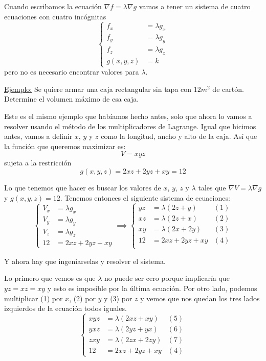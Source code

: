 \documentclass[12pt]{article}
\begin{document}
Cuando escribamos la ecuación $ \nabla f = \lambda \nabla g $ vamos a tener un sistema de cuatro ecuaciones con cuatro incógnitas
\[
  \left\{
  \begin{aligned}
	  f_{x} &= \lambda g_{x} \\
	  f_{y} &= \lambda g_{y} \\
	  f_{z} &= \lambda g_{z} \\
	  g(x,y,z) &= k
  \end{aligned}
  \right.
\]
pero no es necesario encontrar valores para $ \lambda $.


\underline{Ejemplo:} Se quiere armar una caja rectangular sin tapa con $ 12m^2 $ de cartón. Determine el volumen máximo de esa caja.

Este es el mismo ejemplo que habíamos hecho antes, solo que ahora lo vamos a resolver usando el método de los multiplicadores de Lagrange. Igual que hicimos antes, vamos a definir $ x $, $ y $ y $ z $ como la longitud, ancho y alto de la caja. Así que la función que queremos maximizar es:
\[
  V=xyz
\]
sujeta a la restricción
\[
  g(x,y,z)=2xz+2yz+xy=12
\]

Lo que tenemos que hacer es buscar los valores de $ x $, $ y $, $ z $ y $ \lambda $ tales que $ \nabla V = \lambda \nabla g $ y $ g(x,y,z)=12 $. Tenemos entonces el siguiente sistema de ecuaciones:
\[
  \left\{
  \begin{aligned}
	  V_{x} &= \lambda g_{x} \\
	  V_{y} &= \lambda g_{y} \\
	  V_{z} &= \lambda g_{z} \\
	  12 &=2xz + 2yz + xy 
  \end{aligned}
  \right. \implies \left\{
  \begin{aligned}
	  yz &= \lambda \left(2z+y\right) & (1)\\
	  xz &= \lambda \left(2z+x\right) & (2)\\
	  xy &= \lambda \left(2x+2y\right) & (3)\\
	  12 &=2xz + 2yz + xy & (4)\\
  \end{aligned}
  \right.
\]

Y ahora hay que ingeniarselas y resolver el sistema.

Lo primero que vemos es que $ \lambda $ no puede ser cero porque implicaría que $ yz=xz=xy $ y esto es imposible por la última ecuación. Por otro lado, podemos multiplicar (1) por $ x $, (2) por $ y $ y (3) por $ z $ y vemos que nos quedan los tres lados izquierdos de la ecuación todos iguales.
\[
  \left\{
  \begin{aligned}
	  xyz &= \lambda \left(2xz+xy\right) & (5)\\
	  yxz &= \lambda \left(2yz+yx\right) & (6)\\
	  zxy &= \lambda \left(2zx+2zy\right) & (7)\\
	  12 &=2xz + 2yz + xy & (4)
  \end{aligned}
  \right.
\]
\end{document}
